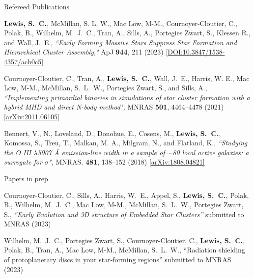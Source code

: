 \documentclass{resume} %
\begin{document}
\begin{rSection}{Refereed Publications}

\begin{etaremune}

\item \textbf{{Lewis}, S.~C.}, {McMillan}, S. L. W., {Mac Low}, M-M., {Cournoyer-Cloutier}, C., {Polak}, B., {Wilhelm}, M.~J.~C., {Tran}, A., {Sills}, A., {Portegies Zwart}, S., {Klessen} R., and {Wall}, J.~E., \textit{``Early Forming Massive Stars Suppress Star Formation and Hierarchical Cluster Assembly,"} ApJ \textbf{944}, 211 (2023) \href{https://iopscience.iop.org/article/10.3847/1538-4357/acb0c5}{[DOI:10.3847/1538-4357/acb0c5]}
 
\item {Cournoyer-Cloutier}, C., {Tran}, A., \textbf{{Lewis}, S.~C.}, {Wall}, J.~E., {Harris}, W. E., {Mac Low}, M-M., {McMillan}, S.~L.~W., {Portegies Zwart}, S., and {Sills}, A., \textit{``Implementing primordial binaries in simulations of star cluster formation with a hybrid MHD and direct N-body method",} MNRAS \textbf{501}, 4464--4478 (2021) \href{https://arxiv.org/abs/2011.06105}{[arXiv:2011.06105]}
  
\item {Bennert}, V., N., {Loveland}, D., {Donohue}, E., {Cosens}, M., \textbf{{Lewis}, S.~C.}, {Komossa}, S., {Treu}, T., {Malkan}, M. A., {Milgram}, N., and {Flatland}, K., \textit{``Studying the O III $\lambda$5007 Å emission-line width in a sample of $\sim$80 local active galaxies: a surrogate for $\sigma$",} MNRAS. \textbf{481}, 138--152 (2018) \href{https://arxiv.org/abs/1808.04821}{[arXiv:1808.04821]}
\end{etaremune}

\end{rSection}


\begin{rSection}{Papers in prep}
\begin{etaremune}
\item {Cournoyer-Cloutier}, C., {Sills}, A., {Harris}, W.~E., {Appel}, S., \textbf{{Lewis}, S.~C.}, {Polak}, B., {Wilhelm}, M.~J.~C., {Mac Low}, M-M., {McMillan}, S.~L.~W., {Portegies Zwart}, S., \textit{``Early Evolution and 3D structure of Embedded Star Clusters''} submitted to MNRAS (2023)

\item {Wilhelm}, M.~J.~C., {Portegies Zwart}, S., {Cournoyer-Cloutier}, C., \textbf{{Lewis}, S.~C.}, {Polak}, B., {Tran}, A., {Mac Low}, M-M., {McMillan}, S.~L.~W., ``Radiation shielding of protoplanetary discs in your star-forming regions'' submitted to MNRAS (2023)

\end{etaremune}
\end{rSection}
\end{document}
